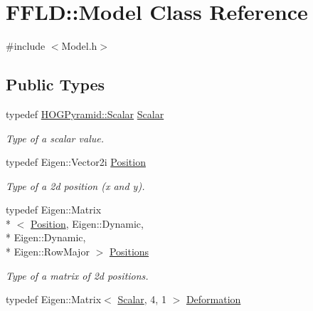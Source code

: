 \hypertarget{class_f_f_l_d_1_1_model}{\section{F\-F\-L\-D\-:\-:Model Class Reference}
\label{class_f_f_l_d_1_1_model}
}


{\ttfamily \#include $<$Model.\-h$>$}

\subsection*{Public Types}
\begin{DoxyCompactItemize}
\item 
\hypertarget{class_f_f_l_d_1_1_model_a81cb0b1b5689c8d28af13eb18811b52a}{typedef \hyperlink{class_f_f_l_d_1_1_h_o_g_pyramid_af17c08ed86557e0a0aecb4814daf87c3}{H\-O\-G\-Pyramid\-::\-Scalar} \hyperlink{class_f_f_l_d_1_1_model_a81cb0b1b5689c8d28af13eb18811b52a}{Scalar}}\label{class_f_f_l_d_1_1_model_a81cb0b1b5689c8d28af13eb18811b52a}

\begin{DoxyCompactList}\small\item\em Type of a scalar value. \end{DoxyCompactList}\item 
\hypertarget{class_f_f_l_d_1_1_model_a4793a991f92f12cdf3f692e256e49f35}{typedef Eigen\-::\-Vector2i \hyperlink{class_f_f_l_d_1_1_model_a4793a991f92f12cdf3f692e256e49f35}{Position}}\label{class_f_f_l_d_1_1_model_a4793a991f92f12cdf3f692e256e49f35}

\begin{DoxyCompactList}\small\item\em Type of a 2d position (x and y). \end{DoxyCompactList}\item 
\hypertarget{class_f_f_l_d_1_1_model_ac0493e10c6cde7f65bd6244fdb679ea3}{typedef Eigen\-::\-Matrix\\*
$<$ \hyperlink{class_f_f_l_d_1_1_model_a4793a991f92f12cdf3f692e256e49f35}{Position}, Eigen\-::\-Dynamic, \\*
Eigen\-::\-Dynamic, \\*
Eigen\-::\-Row\-Major $>$ \hyperlink{class_f_f_l_d_1_1_model_ac0493e10c6cde7f65bd6244fdb679ea3}{Positions}}\label{class_f_f_l_d_1_1_model_ac0493e10c6cde7f65bd6244fdb679ea3}

\begin{DoxyCompactList}\small\item\em Type of a matrix of 2d positions. \end{DoxyCompactList}\item 
\hypertarget{class_f_f_l_d_1_1_model_a378913e215700f42ec642aa748c352c3}{typedef Eigen\-::\-Matrix$<$ \hyperlink{class_f_f_l_d_1_1_model_a81cb0b1b5689c8d28af13eb18811b52a}{Scalar}, 4, 1 $>$ \hyperlink{class_f_f_l_d_1_1_model_a378913e215700f42ec642aa748c352c3}{Deformation}}\label{class_f_f_l_d_1_1_model_a378913e215700f42ec642aa748c352c3}


\end{DoxyCompactItemize}
